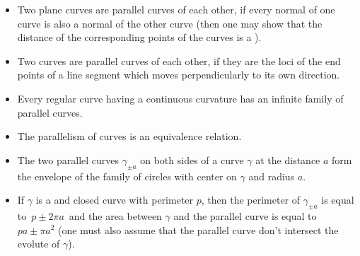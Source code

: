 \documentclass[12pt]{article}
\theoremstyle{definition}
\begin{document}
\begin{itemize}

\item Two plane curves are parallel curves of each other, if every normal of one curve is also a normal of the other curve (then one may show that the distance of the corresponding points of the curves is a ).

\item Two curves are parallel curves of each other, if they are the loci of the end points of a line segment which moves perpendicularly to its own direction.

\item Every regular curve having a continuous curvature has an infinite family of parallel curves.

\item The parallelism of curves is an equivalence relation.

\item The two parallel curves $\gamma_{\pm a}$ on both sides of a curve $\gamma$ at the distance $a$ form the envelope of the family of circles with center on $\gamma$ and radius $a$.

\item If $\gamma$ is a  and closed curve with perimeter $p$, then the perimeter of $\gamma_{\pm a}$ is equal to\, $p\pm 2\pi a$\, and the area between $\gamma$ and the parallel curve is equal to\,  
$pa\pm\pi a^2$ (one must also assume that the parallel curve don't intersect the evolute of $\gamma$).

\end{itemize}
\end{document}
